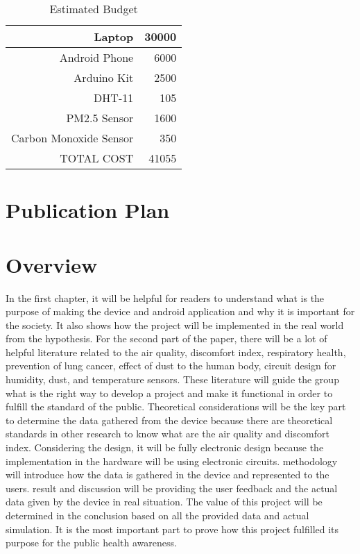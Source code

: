 \begin{table}[htbp]
  \centering
  \caption{Estimated Budget}
    \begin{tabular}{rr}
    \toprule
    Laptop & 30000 \\
    \midrule
    Android Phone & 6000 \\
    Arduino Kit & 2500 \\
    DHT-11 & 105 \\
    PM2.5 Sensor & 1600 \\
    Carbon Monoxide Sensor & 350 \\
    TOTAL COST & 41055 \\
    \bottomrule
    \end{tabular}%
  \label{tab:addlabel}%
\end{table}%

\ifFinished
\else


\section{Publication Plan}
\blindtext

\fi


\section{Overview}

In the first chapter, it will be helpful for readers to understand what is the purpose of making the device and android application and why it is important for the society. It also shows how the project will be implemented in the real world from the hypothesis. For the second part of the paper, there will be a lot of helpful literature related to the air quality, discomfort index, respiratory health, prevention of lung cancer, effect of dust to the human body, circuit design for humidity, dust, and temperature sensors. These literature will guide the group what is the right way to develop a project and make it functional in order to fulfill the standard of the public. Theoretical considerations will be the key part to determine the data gathered from the device because there are theoretical standards in other research to know what are the air quality and discomfort index. Considering the design, it will be fully electronic design because the implementation in the hardware will be using electronic circuits. methodology will introduce how the data is gathered in the device and represented to the users. result and discussion will be providing the user feedback and the actual data given by the device in real situation. The value of this project will be determined in the conclusion based on all the provided data and actual simulation. It is the most important part to prove how this project fulfilled its purpose for the public health awareness.


